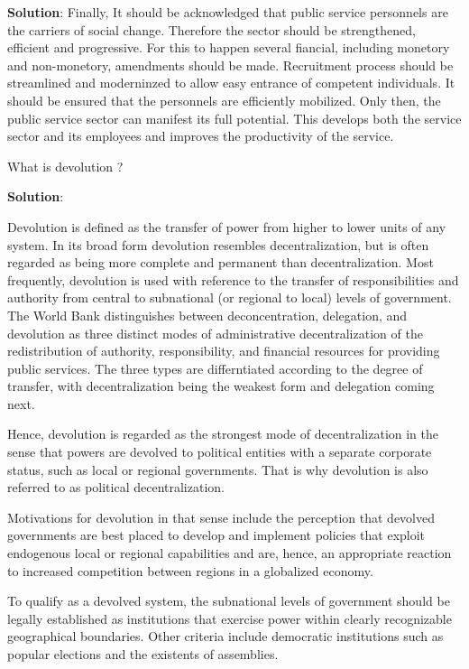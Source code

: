 \documentclass[
]{book}
\newcommand{\question}{\item}
\newenvironment{solution}{ {\bfseries Solution}:}{}
\begin{document}
\begin{questions}
\begin{solution}
Finally, It should be acknowledged that public service personnels are the carriers of social change. Therefore the sector should be strengthened, efficient and progressive. For this to happen several fiancial, including monetory and non-monetory, amendments should be made. Recruitment process should be streamlined and moderninzed to allow easy entrance of competent individuals. It should be ensured that the personnels are efficiently mobilized. Only then, the public service sector can manifest its full potential. This develops both the service sector and its employees and improves the productivity of the service.

\end{solution}

\question What is devolution ?

\begin{solution}

Devolution is defined as the transfer of power from higher to lower units of any system. In its broad form devolution resembles decentralization, but is often regarded as being more complete and permanent than decentralization. Most frequently, devolution is used with reference to the transfer of responsibilities and authority from central to subnational (or regional to local) levels of government. The World Bank distinguishes between deconcentration, delegation, and devolution as three distinct modes of administrative decentralization of the redistribution of authority, responsibility, and financial resources for providing public services. The three types are differntiated according to the degree of transfer, with decentralization being the weakest form and delegation coming next. 

Hence, devolution is regarded as the strongest mode of decentralization in the sense that powers are devolved to political entities with a separate corporate status, such as local or regional governments. That is why devolution is also referred to as political decentralization. 

Motivations for devolution in that sense include the perception that devolved governments are best placed to develop and implement policies that exploit endogenous local or regional capabilities and are, hence, an appropriate reaction to increased competition between regions in a globalized economy.

To qualify as a devolved system, the subnational levels of government should be legally established as institutions that exercise power within clearly recognizable geographical boundaries. Other criteria include democratic institutions such as popular elections and the existents of assemblies.


\end{solution}
\end{questions}
\end{document}
